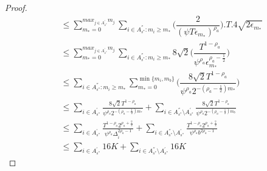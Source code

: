 \begin{proof}
\begin{align*}
&\leq\sum_{m_{*}=0}^{max_{j\in A^{'}_{s^{*}}}m_{j}}\sum_{i\in A^{''}_{s^{*}}:m_{i} \geq m_{*}}\bigg(\dfrac{2}{(\psi  T\epsilon_{m_{*}})^{\rho_{a}}} \bigg).T.4\sqrt{2\epsilon_{m_{*}}} \\
&\leq\sum_{m_{*}=0}^{max_{j\in A^{'}_{s^{*}}}m_{j}}\sum_{i\in A^{''}_{s^{*}}:m_{i} \geq m_{*}}8\sqrt{2}\bigg(\dfrac{T^{1-\rho_{a}}}{\psi^{\rho_{a}}\epsilon_{m_{*}}^{\rho_{a}-\frac{1}{2}}} \bigg)\\
&\leq\sum_{i\in A^{''}_{s^{*}}:m_{i} \geq m_{*}}\sum_{m_{*}=0}^{\min{\lbrace m_{i},m_{b}\rbrace}}\bigg(\dfrac{8\sqrt{2} T^{1-\rho_{a}}}{\psi^{\rho_{a}}2^{-(\rho_{a}-\frac{1}{2})m_{*}}} \bigg)\\
&\!\leq\!\!\sum_{i\in A^{'}_{s^{*}}}\frac{8\sqrt{2} T^{1-\rho_{a}}}{\psi^{\rho_{a}}2^{-(\rho_{a}-\frac{1}{2})m_{*}}}\! +\!\!\!\sum_{i\in A^{''}_{s^{*}}\setminus A^{'}_{s^{*}}}\!\frac{8\sqrt{2} T^{1-\rho_{a}}}{\psi^{\rho_{a}}2^{-(\rho_{a}-\frac{1}{2})m_{b}}} \\
&\!\leq\!\!\sum_{i\in A^{'}_{s^{*}}}\frac{T^{1-\rho_{a}}2^{\rho_{a}+\frac{7}{2}}}{\psi^{\rho_{a}}\Delta_{i}^{2\rho_{a}-1}} \!+\!\!\!\sum_{i\in A^{''}_{s^{*}}\setminus A^{'}_{s^{*}}}\!\!\frac{T^{1-\rho_{a}}2^{\rho_{a}+\frac{7}{2}}}{\psi^{\rho_{a}}b^{2\rho_{a}-1}} \\
& \leq \sum_{i\in A^{'}_{s^{*}}} 16K \!+\!\!\!\sum_{i\in A^{''}_{s^{*}}\setminus A^{'}_{s^{*}}}\!\! 16K
\end{align*}



\end{proof}
